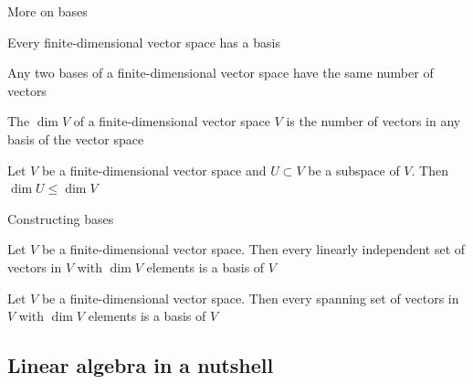 \documentclass[aspectratio=169]{beamer}\usepackage[]{graphicx}\usepackage[]{xcolor}
\begin{document}
\begin{frame}{More on bases}
	\begin{theorem}
	Every finite-dimensional vector space has a basis
	\end{theorem}
	\vfill
	\begin{importanttheorem}
		Any two bases of a finite-dimensional vector space have the same number of vectors
	\end{importanttheorem}
	\vfill
	\begin{definition}[Dimension]
		The  $\dim V$ of a finite-dimensional vector space $V$ is the number of vectors in any basis of the vector space
	\end{definition}
	\vfill
	\begin{theorem}
		Let $V$ be a finite-dimensional vector space and $U\subset V$ be a subspace of $V$. Then $\dim U\leq \dim V$
	\end{theorem}
\end{frame}


\begin{frame}{Constructing bases}
	\begin{theorem}
		Let $V$ be a finite-dimensional vector space. Then every linearly independent set of vectors in $V$ with $\dim V$ elements is a basis of $V$
	\end{theorem}
	\vfill
	\begin{theorem}
		Let $V$ be a finite-dimensional vector space. Then every spanning set of vectors in $V$ with $\dim V$ elements is a basis of $V$
	\end{theorem}
\end{frame}



\subsection{Linear algebra in a nutshell}
\end{document}
